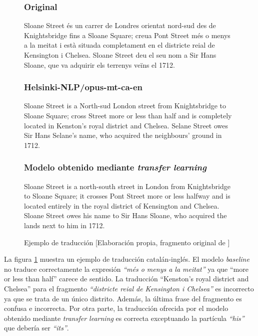 \begin{figure}[H]
\subsubsection{Original}
\begin{spverbatim}
Sloane Street és un carrer de Londres orientat nord-sud des de Knightsbridge fins a Sloane Square; creua Pont Street més o menys a la meitat i està situada completament en el districte reial de Kensington i Chelsea. Sloane Street deu el seu nom a Sir Hans Sloane, que va adquirir els terrenys veïns el 1712.
\end{spverbatim}

\subsubsection{Helsinki-NLP/opus-mt-ca-en}
\begin{spverbatim}
Sloane Street is a North-sud London street from Knightsbridge to Sloane Square; cross Street more or less than half and is completely located in Kenston's royal district and Chelsea. Selane Street owes Sir Hans Selane's name, who acquired the neighbours' ground in 1712.
\end{spverbatim}

\subsubsection{Modelo obtenido mediante \textit{transfer learning}}
\begin{spverbatim}
Sloane Street is a north-south street in London from Knightsbridge to Sloane Square; it crosses Pont Street more or less halfway and is located entirely in the royal district of Kensington and Chelsea. Sloane Street owes his name to Sir Hans Sloane, who acquired the lands next to him in 1712.
\end{spverbatim}
\caption{Ejemplo de traducción [Elaboración propia, fragmento original de \cite{ContributorstoWikimediaprojects2021Aug}]}\label{transferexample}
\end{figure}

La figura \ref{transferexample} muestra un ejemplo de traducción catalán-inglés. El modelo \textit{baseline} no traduce correctamente la expresión \textit{``més o menys a la meitat''} ya que ``more or less than half'' carece de sentido. La traducción ``Kenston's royal district and Chelsea'' para el fragmento \textit{``districte reial de Kensington i Chelsea''} es incorrecto ya que se trata de un único distrito. Además, la última frase del fragmento es confusa e incorrecta. Por otra parte, la traducción ofrecida por el modelo obtenido mediante \textit{transfer learning} es correcta exceptuando la partícula \textit{``his''} que debería ser \textit{``its''}.